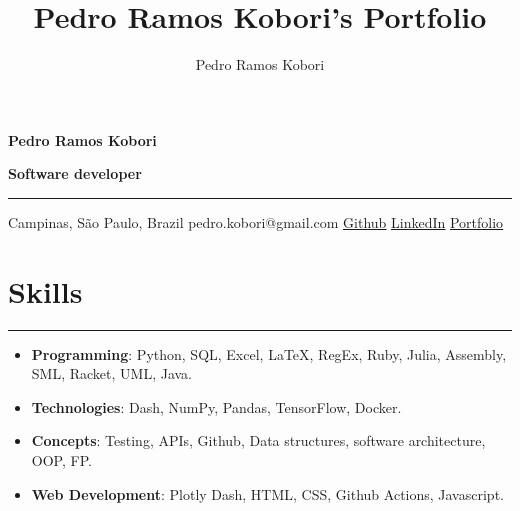 \documentclass[a4paper,10pt]{article}
\title{Pedro Ramos Kobori's Portfolio}
\newcommand{\ulink}[2]{\href{#1}{\underline{#2}}}
\begin{document}
\date{}
\author{Pedro Ramos Kobori}

\noindent
\begin{minipage}[t]{0.5\textwidth}
  \begin{flushleft}
    \textbf{\Large Pedro Ramos Kobori}
  \end{flushleft}
\end{minipage}
\begin{minipage}[t]{0.5\textwidth}
  \begin{flushright}
    \textbf{\Large Software developer}
  \end{flushright}
\end{minipage}

\hrule

\vspace{2mm}
\noindent
{
  \centering
  Campinas, São Paulo, Brazil \textbar{}
  pedro.kobori@gmail.com \textbar{}
  \ulink{https://github.com/rokobo}{Github} \textbar{}
  \ulink{https://www.linkedin.com/in/pedrokobori/}{LinkedIn} \textbar{}
  \ulink{https://rokobo.github.io}{Portfolio}
  \par
}

\section*{Skills}
\hrule
\vspace{2mm}
\begin{itemize}[itemsep=0pt]
  \item \textbf{Programming}: Python, SQL, Excel, LaTeX, RegEx, Ruby, Julia, Assembly, SML, Racket, UML, Java.
  \item \textbf{Technologies}: Dash, NumPy, Pandas, TensorFlow, Docker.
  \item \textbf{Concepts}: Testing, APIs, Github, Data structures, software architecture, OOP, FP.
  \item \textbf{Web Development}: Plotly Dash, HTML, CSS, Github Actions, Javascript.
\end{itemize}
\end{document}
